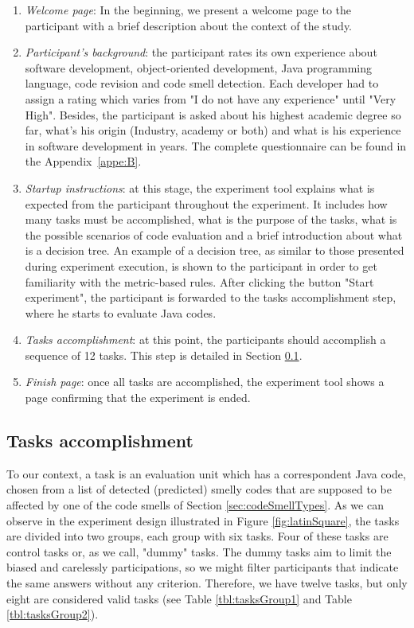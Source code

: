 \begin{enumerate}
    \item \textit{Welcome page}: In the beginning, we present a welcome page to the participant with a brief description about the context of the study.
    
    \item \textit{Participant's background}: the participant rates its own experience about software development, object-oriented development, Java programming language, code revision and code smell detection. Each developer had to assign a rating which varies from "I do not have any experience" until "Very High".  Besides, the participant is asked about his highest academic degree so far, what's his origin (Industry, academy or both) and what is his experience in software development in years. The complete questionnaire can be found in the Appendix~\ref{appe:B}.
    
    \item \textit{Startup instructions}: at this stage, the experiment tool explains what is expected from the participant throughout the experiment. It includes how many tasks must be accomplished, what is the purpose of the tasks, what is the possible scenarios of code evaluation and a brief introduction about what is a decision tree. An example of a decision tree, as similar to those presented during experiment execution,  is shown to the participant in order to get familiarity with the metric-based rules. After clicking the button "Start experiment", the participant is forwarded to the tasks accomplishment step, where he starts to evaluate Java codes.  
    
    \item \textit{Tasks accomplishment}: at this point, the participants should accomplish a sequence of 12 tasks. This step is detailed in Section \ref{sec:tasksAccomplishment}.  
    
    \item \textit{Finish page}: once all tasks are accomplished, the experiment tool shows a page confirming that the experiment is ended.
    
\end{enumerate}

\subsection{Tasks accomplishment} \label{sec:tasksAccomplishment}

To our context, a task is an evaluation unit which has a correspondent Java code, chosen from a list of detected (predicted) smelly codes that are supposed to be affected by one of the code smells of Section \ref{sec:codeSmellTypes}. As we can observe in the experiment design illustrated in Figure \ref{fig:latinSquare}, the tasks are divided into two groups, each group with six tasks. Four of these tasks are control tasks or, as we call, "dummy" tasks. The dummy tasks aim to limit the biased \cite{palomba2014they} and carelessly participations, so we might filter participants that indicate the same answers without any criterion. Therefore, we have twelve tasks, but only eight are considered valid tasks (see Table \ref{tbl:tasksGroup1} and Table \ref{tbl:tasksGroup2}).

